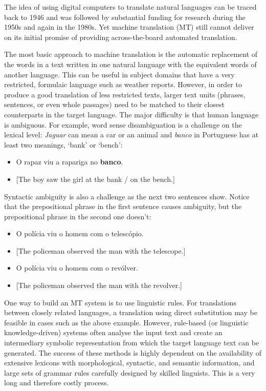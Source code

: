 \documentclass[]{../metanetpaper}
\begin{document}
\begin{multicols}{2}
The idea of using digital computers to translate natural languages can be traced back to 1946 and was followed by substantial funding for research during the 1950s and again in the 1980s. 
Yet machine translation (MT) still cannot deliver on its initial promise of providing across-the-board automated translation.  


The most basic approach to machine translation is the automatic replacement of the words in a text written in one natural language with the equivalent words of another language. This can be useful in subject domains that have a very restricted, formulaic language such as weather reports.
However, in order to produce a good translation of less restricted texts, larger text units (phrases, sentences, or even whole passages) need to be matched to their closest counterparts in the target language. The major difficulty is that human language is ambiguous. For example, word sense disambiguation is a challenge on the lexical level: \textit{Jaguar} can mean a car or an animal and \textit{banco} in Portuguese has at least two meanings, ‘bank’ or ‘bench’:\\

\begin{itemize}
\item O rapaz viu a rapariga no \textbf{banco}.
\item  {[}The boy saw the girl at the bank / on the bench.{]}
\end{itemize}

Syntactic ambiguity is also a challenge as the next two sentences show. Notice that the prepositional phrase in the first sentence causes ambiguity, but the prepositional phrase in the second one doesn't:\\

\begin{itemize}
\item O polícia viu o homem com o telescópio.
\item {[}The policeman observed the man with the telescope.{]}
\item O polícia viu o homem com o revólver.
\item {[}The policeman observed the man with the revolver.{]}
\end{itemize}

One way to build an MT system is to use linguistic rules. For translations between closely related languages, a translation using direct substitution may be feasible in cases such as the above example. However, rule-based (or linguistic knowledge-driven) systems often analyse the input text and create an intermediary symbolic representation from which the target language text can be generated. The success of these methods is highly dependent on the availability of extensive lexicons with morphological, syntactic, and semantic information, and large sets of grammar rules carefully designed by skilled linguists. This is a very long and therefore costly process.


\end{multicols}
\end{document}
